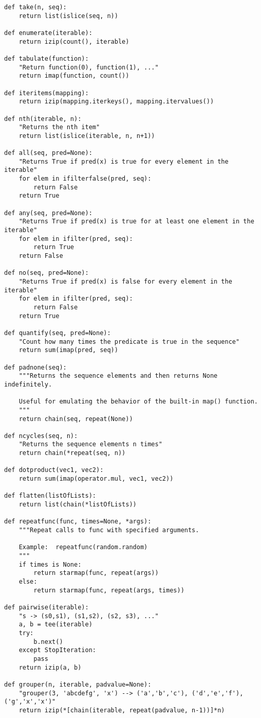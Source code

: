 \begin{verbatim}
def take(n, seq):
    return list(islice(seq, n))

def enumerate(iterable):
    return izip(count(), iterable)

def tabulate(function):
    "Return function(0), function(1), ..."
    return imap(function, count())

def iteritems(mapping):
    return izip(mapping.iterkeys(), mapping.itervalues())

def nth(iterable, n):
    "Returns the nth item"
    return list(islice(iterable, n, n+1))

def all(seq, pred=None):
    "Returns True if pred(x) is true for every element in the iterable"
    for elem in ifilterfalse(pred, seq):
        return False
    return True

def any(seq, pred=None):
    "Returns True if pred(x) is true for at least one element in the iterable"
    for elem in ifilter(pred, seq):
        return True
    return False

def no(seq, pred=None):
    "Returns True if pred(x) is false for every element in the iterable"
    for elem in ifilter(pred, seq):
        return False
    return True

def quantify(seq, pred=None):
    "Count how many times the predicate is true in the sequence"
    return sum(imap(pred, seq))

def padnone(seq):
    """Returns the sequence elements and then returns None indefinitely.

    Useful for emulating the behavior of the built-in map() function.
    """
    return chain(seq, repeat(None))

def ncycles(seq, n):
    "Returns the sequence elements n times"
    return chain(*repeat(seq, n))

def dotproduct(vec1, vec2):
    return sum(imap(operator.mul, vec1, vec2))

def flatten(listOfLists):
    return list(chain(*listOfLists))

def repeatfunc(func, times=None, *args):
    """Repeat calls to func with specified arguments.
    
    Example:  repeatfunc(random.random)
    """
    if times is None:
        return starmap(func, repeat(args))
    else:
        return starmap(func, repeat(args, times))

def pairwise(iterable):
    "s -> (s0,s1), (s1,s2), (s2, s3), ..."
    a, b = tee(iterable)
    try:
        b.next()
    except StopIteration:
        pass
    return izip(a, b)

def grouper(n, iterable, padvalue=None):
    "grouper(3, 'abcdefg', 'x') --> ('a','b','c'), ('d','e','f'), ('g','x','x')"
    return izip(*[chain(iterable, repeat(padvalue, n-1))]*n)


\end{verbatim}
